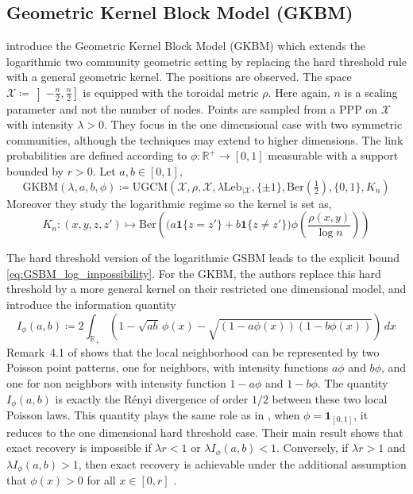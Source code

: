 \documentclass[runningheads]{llncs}
\begin{document}
\subsection{Geometric Kernel Block Model (GKBM)}

\citep{avrachenkov2026communitydetectionblockmodels} introduce the Geometric Kernel Block Model (GKBM) which extends the logarithmic two community geometric setting by replacing the hard threshold rule with a general geometric kernel. The positions are observed. The space \( \mathcal X \coloneqq \left]-\frac n2,\frac n2 \right ] \) is equipped with the toroidal metric \(\rho\). Here again, \(n\) is a scaling parameter and not the number of nodes.
Points are sampled from a PPP on \(\mathcal{X}\) with intensity \(\lambda > 0\). They focus in the one dimensional case with two symmetric communities, although the techniques may extend to higher dimensions. The link probabilities are defined according to \(\phi : \mathbb{R}^+ \to [0,1]\) measurable with a support bounded by \(r >0\). Let \(a,b \in [0,1]\),
\[
\mathrm{GKBM}(\lambda,a,b,\phi)\coloneqq
\mathrm{UGCM}(\mathcal X,\rho,\mathcal X,\lambda \mathrm{Leb}_{\mid \mathcal X},\{\pm1\},\mathrm{Ber}(\tfrac{1}{2}),\{0,1\},K_n)
\]
Moreover they study the logarithmic regime so the kernel is set as,
\[
K_n:(x,y,z,z')\longmapsto \mathrm{Ber}\!\left(\bigl(a\mathbf 1\{z=z'\}+b\mathbf 1\{z\neq z'\}\bigr)\phi\!\left(\frac{\rho(x,y)}{\log n}\right)\right)
\]

The hard threshold version of the logarithmic GSBM leads to the explicit bound \eqref{eq:GSBM_log_impossibility}. For the GKBM, the authors replace this hard threshold by a more general kernel on their restricted one dimensional model, and introduce the information quantity
\[
I_\phi(a,b)\coloneqq 2\int_{\mathbb R_+}\left(1-\sqrt{ab}\,\phi(x)-\sqrt{(1-a\phi(x))(1-b\phi(x))}\right)\,dx
\]
Remark~4.1 of \citep{avrachenkov2026communitydetectionblockmodels} shows that the local neighborhood can be represented by two Poisson point patterns, one for neighbors, with intensity functions \(a\phi\) and \(b\phi\), and one for non neighbors with intensity function \(1-a\phi\) and \(1-b\phi\). The quantity \(I_\phi(a,b)\) is exactly the Rényi divergence of order \(1/2\) between these two local Poisson laws. This quantity plays the same role as in \citep{abbe2021community}, when \(\phi=\mathbf 1_{[0,1]}\), it reduces to the one dimensional hard threshold case. Their main result shows that exact recovery is impossible if \(\lambda r<1\) or \(\lambda I_\phi(a,b)<1\). Conversely, if \(\lambda r>1\) and \(\lambda I_\phi(a,b)>1\), then exact recovery is achievable under the additional assumption that \(\phi(x)>0\) for all \(x\in[0,r]\) \citep{avrachenkov2026communitydetectionblockmodels}. 
\end{document}
